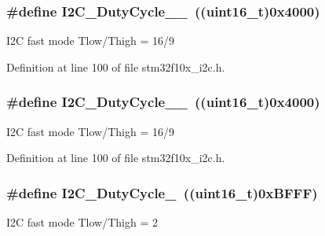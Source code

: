 \subsubsection[{\texorpdfstring{I2\+C\+\_\+\+Duty\+Cycle\+\_\+16\+\_\+9}{I2C_DutyCycle_16_9}}]{\setlength{\rightskip}{0pt plus 5cm}\#define I2\+C\+\_\+\+Duty\+Cycle\+\_\+\_~(({\bf uint16\+\_\+t})0x4000)}\hypertarget{group___i2_c__duty__cycle__in__fast__mode_ga2b4ff186808a8095fc2d1b8193f30ce1}{}\label{group___i2_c__duty__cycle__in__fast__mode_ga2b4ff186808a8095fc2d1b8193f30ce1}
I2C fast mode Tlow/\+Thigh = 16/9 

Definition at line 100 of file stm32f10x\+\_\+i2c.\+h.

\subsubsection[{\texorpdfstring{I2\+C\+\_\+\+Duty\+Cycle\+\_\+16\+\_\+9}{I2C_DutyCycle_16_9}}]{\setlength{\rightskip}{0pt plus 5cm}\#define I2\+C\+\_\+\+Duty\+Cycle\+\_\+\_~(({\bf uint16\+\_\+t})0x4000)}\hypertarget{group___i2_c__duty__cycle__in__fast__mode_ga2b4ff186808a8095fc2d1b8193f30ce1}{}\label{group___i2_c__duty__cycle__in__fast__mode_ga2b4ff186808a8095fc2d1b8193f30ce1}
I2C fast mode Tlow/\+Thigh = 16/9 

Definition at line 100 of file stm32f10x\+\_\+i2c.\+h.

\subsubsection[{\texorpdfstring{I2\+C\+\_\+\+Duty\+Cycle\+\_\+2}{I2C_DutyCycle_2}}]{\setlength{\rightskip}{0pt plus 5cm}\#define I2\+C\+\_\+\+Duty\+Cycle\+\_~(({\bf uint16\+\_\+t})0x\+B\+F\+F\+F)}\hypertarget{group___i2_c__duty__cycle__in__fast__mode_gafe0af31970aceef0fa8df6a10bef35db}{}\label{group___i2_c__duty__cycle__in__fast__mode_gafe0af31970aceef0fa8df6a10bef35db}
I2C fast mode Tlow/\+Thigh = 2 

